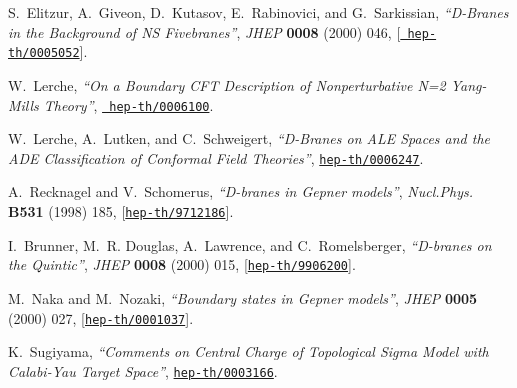 \documentclass[a4paper,12pt]{article}
\numberwithin{equation}{section}
\begin{document}
\begin{thebibliography}{10}
S.~Elitzur, A.~Giveon, D.~Kutasov, E.~Rabinovici, and G.~Sarkissian, {\it
  ``{D-Branes in the Background of NS Fivebranes}''},  {\em JHEP} {\bf 0008}
  (2000) 046, [\href{http://xxx.lanl.gov/abs/hep-th/0005052}{{\tt
  hep-th/0005052}}].

W.~Lerche, {\it ``{On a Boundary CFT Description of Nonperturbative N=2
  Yang-Mills Theory}''},  \href{http://xxx.lanl.gov/abs/hep-th/0006100}{{\tt
  hep-th/0006100}}.

W.~Lerche, A.~Lutken, and C.~Schweigert, {\it ``{D-Branes on ALE Spaces and the
  ADE Classification of Conformal Field Theories}''},
  \href{http://xxx.lanl.gov/abs/hep-th/0006247}{{\tt hep-th/0006247}}.

A.~Recknagel and V.~Schomerus, {\it ``{D-branes in Gepner models}''},  {\em
  Nucl.Phys.} {\bf B531} (1998) 185,
  [\href{http://xxx.lanl.gov/abs/hep-th/9712186}{{\tt hep-th/9712186}}].

I.~Brunner, M.~R. Douglas, A.~Lawrence, and C.~Romelsberger, {\it ``{D-branes
  on the Quintic}''},  {\em JHEP} {\bf 0008} (2000) 015,
  [\href{http://xxx.lanl.gov/abs/hep-th/9906200}{{\tt hep-th/9906200}}].

M.~Naka and M.~Nozaki, {\it ``{Boundary states in Gepner models}''},  {\em
  JHEP} {\bf 0005} (2000) 027,
  [\href{http://xxx.lanl.gov/abs/hep-th/0001037}{{\tt hep-th/0001037}}].

K.~Sugiyama, {\it ``{Comments on Central Charge of Topological Sigma Model with
  Calabi-Yau Target Space}''},
  \href{http://xxx.lanl.gov/abs/hep-th/0003166}{{\tt hep-th/0003166}}.

\end{thebibliography}\endgroup
\end{document}
